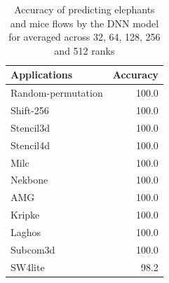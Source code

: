 \begin{table}[h]
  \centering
  \caption{Accuracy of predicting elephants and mice flows by the DNN model for averaged across 32, 64, 128, 256 and 512 ranks}
    \label{tab:model_acc}
    \begin{tabular}{lr} \toprule
\multirow{1}{*}{Applications} & Accuracy \\ \midrule
Random-permutation & 100.0\\
Shift-256 & 100.0\\
Stencil3d & 100.0\\
Stencil4d & 100.0\\
Milc & 100.0\\
Nekbone & 100.0\\
\midrule
AMG & 100.0\\
Kripke & 100.0\\
Laghos & 100.0\\
Subcom3d & 100.0\\
SW4lite & 98.2\\ \bottomrule
\end{tabular}
\end{table}


